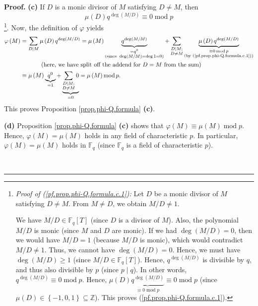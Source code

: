 \documentclass[numbers=enddot,12pt,final,onecolumn,notitlepage]{scrartcl}%
\theoremstyle{definition}
\newenvironment{proof}[1][Proof]{\noindent\textbf{#1.} }{\ \rule{0.5em}{0.5em}}
\let\sumnonlimits\sum
\renewcommand{\sum}{\sumnonlimits\limits}
\begin{document}
\begin{proof}
\textbf{(c)} If $D$ is a monic divisor of $M$ satisfying $D\neq M$, then
\begin{equation}
\mu\left(  D\right)  q^{\deg\left(  M/D\right)  }\equiv0\operatorname{mod}p
\label{pf.prop.phi-Q.formula.c.1}%
\end{equation}
\footnote{\textit{Proof of (\ref{pf.prop.phi-Q.formula.c.1}):} Let $D$ be a
monic divisor of $M$ satisfying $D\neq M$. From $M\neq D$, we obtain
$M/D\neq1$.
\par
We have $M/D\in\mathbb{F}_{q}\left[  T\right]  $ (since $D$ is a divisor of
$M$). Also, the polynomial $M/D$ is monic (since $M$ and $D$ are monic). If we
had $\deg\left(  M/D\right)  =0$, then we would have $M/D=1$ (because $M/D$ is
monic), which would contradict $M/D\neq1$. Thus, we cannot have $\deg\left(
M/D\right)  =0$. Hence, we must have $\deg\left(  M/D\right)  \geq1$ (since
$M/D\in\mathbb{F}_{q}\left[  T\right]  $). Hence, $q^{\deg\left(  M/D\right)
}$ is divisible by $q$, and thus also divisible by $p$ (since $p\mid q$). In
other words, $q^{\deg\left(  M/D\right)  }\equiv0\operatorname{mod}p$. Hence,
$\mu\left(  D\right)  \underbrace{q^{\deg\left(  M/D\right)  }}_{\equiv
0\operatorname{mod}p}\equiv0\operatorname{mod}p$ (since $\mu\left(  D\right)
\in\left\{  -1,0,1\right\}  \subseteq\mathbb{Z}$). This proves
(\ref{pf.prop.phi-Q.formula.c.1}).}. Now, the definition of $\varphi$ yields%
\begin{align*}
\varphi\left(  M\right)   &  =\sum\limits_{D\mid M}\mu\left(  D\right)
q^{\deg\left(  M/D\right)  }=\mu\left(  M\right)  \underbrace{q^{\deg\left(
M/M\right)  }}_{\substack{=q^{0}\\\text{(since }\deg\left(  M/M\right)
=\deg1=0\text{)}}}+\sum\limits_{\substack{D\mid M;\\D\neq M}}\underbrace{\mu
\left(  D\right)  q^{\deg\left(  M/D\right)  }}_{\substack{\equiv
0\operatorname{mod}p\\\text{(by (\ref{pf.prop.phi-Q.formula.c.1}))}}}\\
&  \ \ \ \ \ \ \ \ \ \ \left(  \text{here, we have split off the addend for
}D=M\text{ from the sum}\right) \\
&  \equiv\mu\left(  M\right)  \underbrace{q^{0}}_{=1}+\underbrace{\sum
\limits_{\substack{D\mid M;\\D\neq M}}0}_{=0}=\mu\left(  M\right)
\operatorname{mod}p.
\end{align*}
This proves Proposition \ref{prop.phi-Q.formula} \textbf{(c)}. \medskip

\textbf{(d)} Proposition \ref{prop.phi-Q.formula} \textbf{(c)} shows that
$\varphi\left(  M\right)  \equiv\mu\left(  M\right)  \operatorname{mod}p$.
Hence, $\varphi\left(  M\right)  =\mu\left(  M\right)  $ holds in any field of
characteristic $p$. In particular, $\varphi\left(  M\right)  =\mu\left(
M\right)  $ holds in $\mathbb{F}_{q}$ (since $\mathbb{F}_{q}$ is a field of
characteristic $p$). \medskip


\end{proof}
\end{document}
